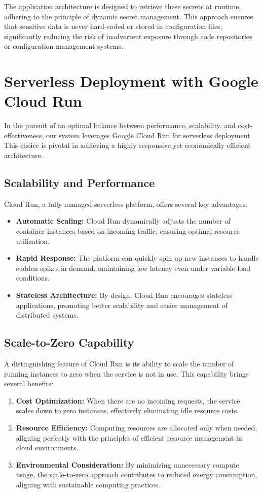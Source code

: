 \documentclass[a4paper, 12pt]{report}
\begin{document}
The application architecture is designed to retrieve these secrets at runtime, adhering to the principle of dynamic secret management. This approach ensures that sensitive data is never hard-coded or stored in configuration files, significantly reducing the risk of inadvertent exposure through code repositories or configuration management systems.


\section{Serverless Deployment with Google Cloud Run}

In the pursuit of an optimal balance between performance, scalability, and cost-effectiveness, our system leverages Google Cloud Run for serverless deployment. This choice is pivotal in achieving a highly responsive yet economically efficient architecture.

\subsection{Scalability and Performance}
Cloud Run, a fully managed serverless platform, offers several key advantages:

\begin{itemize}
    \item \textbf{Automatic Scaling:} Cloud Run dynamically adjusts the number of container instances based on incoming traffic, ensuring optimal resource utilization.
    \item \textbf{Rapid Response:} The platform can quickly spin up new instances to handle sudden spikes in demand, maintaining low latency even under variable load conditions.
    \item \textbf{Stateless Architecture:} By design, Cloud Run encourages stateless applications, promoting better scalability and easier management of distributed systems.
\end{itemize}

\subsection{Scale-to-Zero Capability}
A distinguishing feature of Cloud Run is its ability to scale the number of running instances to zero when the service is not in use. This capability brings several benefits:

\begin{enumerate}
    \item \textbf{Cost Optimization:} When there are no incoming requests, the service scales down to zero instances, effectively eliminating idle resource costs.
    \item \textbf{Resource Efficiency:} Computing resources are allocated only when needed, aligning perfectly with the principles of efficient resource management in cloud environments.
    \item \textbf{Environmental Consideration:} By minimizing unnecessary compute usage, the scale-to-zero approach contributes to reduced energy consumption, aligning with sustainable computing practices.
\end{enumerate}
\end{document}
